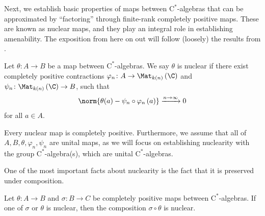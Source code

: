 Next, we establish basic properties of maps between $\mathrm{C}^{\ast}$-algebras that can be approximated by ``factoring'' through finite-rank completely positive maps. These are known as nuclear maps, and they play an integral role in establishing amenability. The exposition from here on out will follow (loosely) the results from \cite{brown_and_ozawa}.
\begin{definition}
  Let $\theta\colon A\rightarrow B$ be a map between $\mathrm{C}^{\ast}$-algebras. We say $\theta$ is nuclear if there exist completely positive contractions $\varphi_n\colon A\rightarrow \Mat_{k(n)}\left( \C \right)$ and $\psi_n\colon \Mat_{k(n)}\left( \C \right)\rightarrow B$, such that
  \begin{align*}
    \norm{\theta(a) - \psi_n\circ \varphi_n\left( a \right)}\xrightarrow{n\rightarrow\infty} 0
  \end{align*}
  for all $a\in A$.
\end{definition}
\begin{remark}
Every nuclear map is completely positive. Furthermore, we assume that all of $A,B,\theta,\varphi_n,\psi_n$ are unital maps, as we will focus on establishing nuclearity with the group $\mathrm{C}^{\ast}$-algebra(s), which are unital $\mathrm{C}^{\ast}$-algebras.
\end{remark}
One of the most important facts about nuclearity is the fact that it is preserved under composition.
\begin{proposition}\label{prop:nuclearity_composition}
  Let $\theta\colon A\rightarrow B$ and $\sigma\colon B\rightarrow C$ be completely positive maps between $\mathrm{C}^{\ast}$-algebras. If one of $\sigma$ or $\theta$ is nuclear, then the composition $\sigma\circ\theta$ is nuclear.
\end{proposition}
